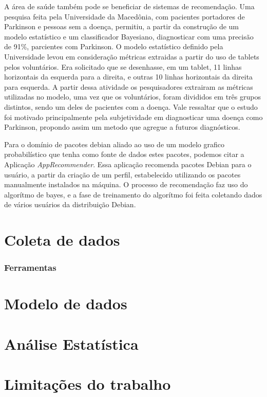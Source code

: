 A área de saúde também pode se beneficiar de sistemas de recomendação. Uma pesquisa feita pela Universidade da Macedônia,  com pacientes portadores de Parkinson e pessoas sem a doença, permitiu, a partir da construção de um modelo estatístico e um classificador Bayesiano, diagnosticar com uma precisão de 91\%, parcientes com Parkinson\cite{Kotsavasiloglou}. O modelo estatístico definido pela Universidade levou em consideração métricas extraidas a partir do uso de tablets pelos voluntários. Era solicitado que se desenhasse, em um tablet, 11 linhas horizontais da esquerda para a direita, e outras 10 linhas horizontais da direita para esquerda. A partir dessa atividade os pesquisadores extrairam as métricas utilizadas no modelo, uma vez que os voluntários, foram divididos em três grupos distintos, sendo um deles de pacientes com a doença. Vale ressaltar que o estudo foi motivado principalmente pela subjetividade em diagnosticar uma doença como Parkinson, propondo assim um metodo que agregue a futuros diagnósticos.

Para o domínio de pacotes debian aliado ao uso de um modelo grafico probabilístico que tenha como fonte de dados estes pacotes, podemos citar a Aplicação \textit{AppRecommender}. Essa aplicação recomenda pacotes Debian para o usuário,
a partir da criação de um perfil, estabelecido utilizando os pacotes manualmente instalados na máquina. 
O processo de recomendação faz uso do algorítmo de bayes, e a fase de treinamento do algorítmo foi feita coletando dados de vários usuários da distribuição Debian.

\section{Coleta de dados}

\subsubsection{Ferramentas}

\subsection{}

\section{Modelo de dados}

\section{Análise Estatística}

\section{Limitações do trabalho}


